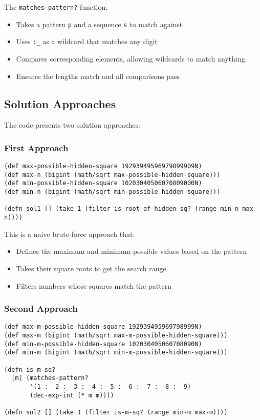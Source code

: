 \documentclass{article}
\begin{document}
The \texttt{matches-pattern?} function:
\begin{itemize}
    \item Takes a pattern \texttt{p} and a sequence \texttt{s} to match against
    \item Uses \texttt{:\_} as a wildcard that matches any digit
    \item Compares corresponding elements, allowing wildcards to match anything
    \item Ensures the lengths match and all comparisons pass
\end{itemize}

\subsection{Solution Approaches}

The code presents two solution approaches:

\subsubsection{First Approach}
\begin{lstlisting}
(def max-possible-hidden-square 19293949596979899909N)
(def max-n (bigint (math/sqrt max-possible-hidden-square)))
(def min-possible-hidden-square 10203040506070809000N)
(def min-n (bigint (math/sqrt min-possible-hidden-square)))

(defn sol1 [] (take 1 (filter is-root-of-hidden-sq? (range min-n max-n))))
\end{lstlisting}

This is a naive brute-force approach that:
\begin{itemize}
    \item Defines the maximum and minimum possible values based on the pattern
    \item Takes their square roots to get the search range
    \item Filters numbers whose squares match the pattern
\end{itemize}

\subsubsection{Second Approach}
\begin{lstlisting}
(def max-m-possible-hidden-square 192939495969798999N)
(def max-m (bigint (math/sqrt max-m-possible-hidden-square)))
(def min-m-possible-hidden-square 102030405060708090N)
(def min-m (bigint (math/sqrt min-m-possible-hidden-square)))

(defn is-m-sq?
  [m] (matches-pattern?
       '(1 :_ 2 :_ 3 :_ 4 :_ 5 :_ 6 :_ 7 :_ 8 :_ 9)
       (dec-exp-int (* m m))))

(defn sol2 [] (take 1 (filter is-m-sq? (range min-m max-m))))
\end{lstlisting}
\end{document}
